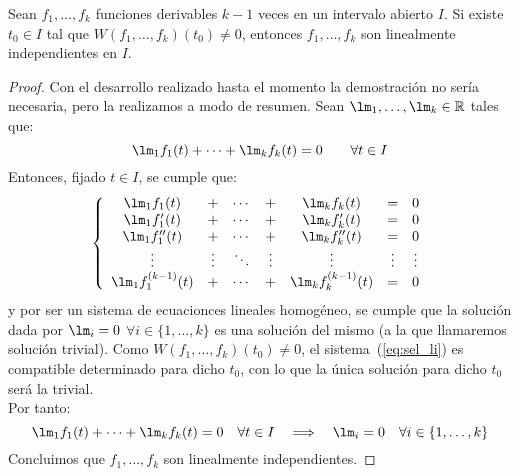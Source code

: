\begin{prop}\label{prop:Wronskiano}
    Sean $f_1,\ldots,f_k$ funciones derivables $k-1$ veces en un intervalo abierto $I$. Si existe $t_0\in I$ tal que $W(f_1,\ldots,f_k)(t_0) \neq 0$, entonces $f_1,\ldots,f_k$ son linealmente independientes en $I$.
    \begin{proof}
        Con el desarrollo realizado hasta el momento la demostración no sería necesaria, pero la realizamos a modo de resumen.\newline
        Sean $\lm_1,\ldots,\lm_k\in \mathbb{R}$ tales que:
        \begin{equation*}
            \lm_1f_1(t) + \cdots + \lm_k f_k(t) = 0 \qquad \forall t\in I
        \end{equation*}
        Entonces, fijado $t\in I$, se cumple que:
        \begin{equation}\label{eq:sel_li}
            \left\{\begin{array}{ccccccc}
                    \lm_1 f_1(t) &+& \cdots &+& \lm_k f_k(t) &=& 0 \\
                    \lm_1 f_1'(t) &+& \cdots &+& \lm_k f_k'(t) &=& 0 \\
                    \lm_1 f_1''(t) &+& \cdots &+& \lm_k f_k''(t) &=& 0 \\
                    \vdots & \vdots & \ddots & \vdots & \vdots & \vdots & \vdots \\
                    \lm_1 f_1^{(k-1)}(t) &+& \cdots &+& \lm_k f_k^{(k-1)}(t) &=& 0 
            \end{array}\right.
        \end{equation}
        y por ser un sistema de ecuacionces lineales homogéneo, se cumple que la solución dada por $\lm_i = 0$ $\forall i \in \{1,\ldots,k\}$ es una solución del mismo (a la que llamaremos solución trivial). Como $W(f_1,\ldots,f_k)(t_0)\neq 0$, el sistema~(\ref{eq:sel_li}) es compatible determinado para dicho $t_0$, con lo que la única solución para dicho $t_0$ será la trivial.\\

        Por tanto:
        \begin{equation*}
            \lm_1f_1(t) + \cdots + \lm_k f_k(t) = 0 \quad \forall t\in I \quad \Longrightarrow \quad  \lm_i = 0 \quad \forall i \in \{1,\ldots,k\}
        \end{equation*}
        Concluimos que $f_1,\ldots,f_k$ son linealmente independientes.
    \end{proof}
\end{prop}

